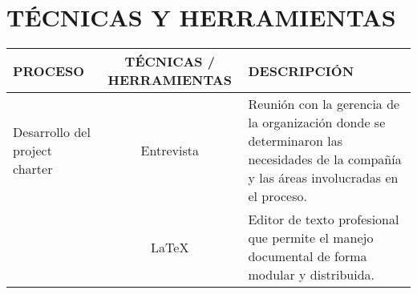 \chapter{T\'ECNICAS Y HERRAMIENTAS}
%
\begin{table}[H]
	\centering
	\begin{tabular}{| m{5cm} | c | p{5cm} |}
	\hline
	\textbf{PROCESO} & \textbf{T\'ECNICAS / HERRAMIENTAS} & \textbf{DESCRIPCI\'ON} \\ \hline
	 Desarrollo del project charter & Entrevista & Reuni\'on con la gerencia de la organizaci\'on
	  donde se determinaron las necesidades de la compa\~n\'ia y las \'areas involucradas en el proceso. \\ 
	  \cline{2-3}
	 & \LaTeX & Editor de texto profesional que permite el manejo documental de forma modular y distribuida. \\
	\hline
	\end{tabular}
\end{table}